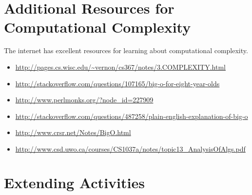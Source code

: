 \section {Additional Resources for Computational Complexity}

The internet has excellent resources for learning about computational
complexity. 

\begin{itemize}
\item \url{http://pages.cs.wisc.edu/~vernon/cs367/notes/3.COMPLEXITY.html}
\item  \url{http://stackoverflow.com/questions/107165/big-o-for-eight-year-olds}
\item  \url{http://www.perlmonks.org/?node_id=227909}
\item  \url{http://stackoverflow.com/questions/487258/plain-english-explanation-of-big-o}
\item  \url{http://www.crsr.net/Notes/BigO.html}
\item  \url{http://www.csd.uwo.ca/courses/CS1037a/notes/topic13_AnalysisOfAlgs.pdf}
\end{itemize}

\section{Extending Activities}

